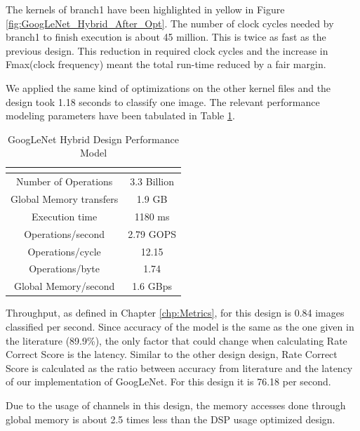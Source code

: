 The kernels of branch1 have been highlighted in yellow in Figure \ref{fig:GoogLeNet_Hybrid_After_Opt}. The number of clock cycles needed by branch1 to finish execution is about 45 million. This is twice as fast as the previous design. This reduction in required clock cycles and the increase in Fmax(clock frequency) meant the total run-time reduced by a fair margin.

We applied the same kind of optimizations on the other kernel files and the design took 1.18 seconds to classify one image. The relevant performance modeling parameters have been tabulated in Table \ref{tab:GoogLeNetHybridPerfModel}.


\begin{table}[!htb]                          
 \centering
  \captionsetup{
 justification = centering
}
\caption{GoogLeNet Hybrid Design Performance Model}
    \begin{tabular}{|c|c|}
    \multicolumn{2}{c}{\textbf{}} \\ \hline

     Number of Operations    &   3.3 Billion \\ \hline
      Global Memory transfers &   1.9 GB            \\ \hline          
      Execution time    &  1180 ms    \\ \hline
      Operations/second   &   2.79 GOPS \\ \hline
      Operations/cycle &   12.15             \\ \hline
      Operations/byte       &   1.74 \\ \hline
      Global Memory/second & 1.6 GBps  \\ \hline

    \end{tabular}
    \label{tab:GoogLeNetHybridPerfModel}                            

\end{table} 


Throughput, as defined in Chapter \ref{chp:Metrics}, for this design is 0.84 images classified per second. Since accuracy of the model is the same as the one given in the literature (89.9\%), the only factor that could change when calculating Rate Correct Score is the latency. Similar to the other design design, Rate Correct Score is calculated as the ratio between accuracy from literature and the latency of our implementation of GoogLeNet. For this design it is 76.18 per second.

Due to the usage of channels in this design, the memory accesses done through global memory is about 2.5 times less than the DSP usage optimized design. 

